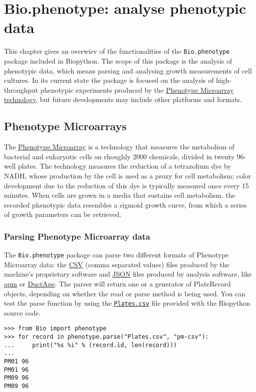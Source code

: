 \chapter{Bio.phenotype: analyse phenotypic data}
\label{chapter:phenotype}

This chapter gives an overwiev of the functionalities of the
\verb|Bio.phenotype| package included in Biopython. The scope of this
package is the analysis of phenotypic data, which means parsing and 
analysing growth measurements of cell cultures.
In its current state the package is focused on the analysis of
high-throughput phenotypic experiments produced by the 
\href{https://en.wikipedia.org/wiki/Phenotype_microarray}{Phenotype Microarray technology}, 
but future developments may include other platforms and formats.

\section{Phenotype Microarrays}
\label{sec:phenotypemicroarrays}

The \href{https://en.wikipedia.org/wiki/Phenotype_microarray}{Phenotype Microarray}
is a technology that measures the metabolism of bacterial
and eukaryotic cells on rhoughly 2000 chemicals, divided in twenty 96-well
plates.
The technology measures the reduction of a tetrazolium dye by
NADH, whose production by the cell is used as a proxy for cell metabolism;
color development due to the reduction of this dye is typically measured
once every 15 minutes.
When cells are grown in a media that sustains cell metabolism, the
recorded phenotypic data resembles a sigmoid growth curve, from which a
series of growth parameters can be retrieved.

\subsection{Parsing Phenotype Microarray data}

The \verb|Bio.phenotype| package can parse two different formats of
Phenotype Microarray data: the
\href{https://en.wikipedia.org/wiki/Comma-separated_values}{CSV}
(comma separated values) files produced by the machine's proprietary
software and \href{https://en.wikipedia.org/wiki/JSON}{JSON}
files produced by analysis software, like
\href{https://www.dsmz.de/research/microorganisms/projects/analysis-of-omnilog-phenotype-microarray-data.html}{opm}
or \href{http://combogenomics.github.io/DuctApe/}{DuctApe}.
The parser will return one or a generator of PlateRecord objects, depending
on whether the read or parse method is being used.
You can test the parse function by using the \href{http://biopython.org/SRC/biopython/Doc/examples/Plates.csv}{\texttt{Plates.csv}} file provided with the Biopython source code.
\begin{verbatim}
>>> from Bio import phenotype
>>> for record in phenotype.parse("Plates.csv", "pm-csv"):
...     print("%s %i" % (record.id, len(record)))
...
PM01 96
PM01 96
PM09 96
PM09 96
\end{verbatim}

